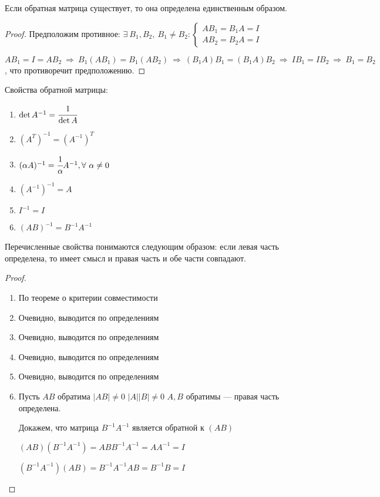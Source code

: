 \begin{theor}Если обратная матрица существует, то она определена единственным образом.\end{theor}
\begin{proof}
Предположим противное: $\exists\ B_1,B_2,\ B_1\neq{}B_2:\left\{\begin{aligned} AB_1=B_1A=I \\ AB_2=B_2A=I \end{aligned}\right.$

$AB_1=I=AB_2\ \Rightarrow\ B_1(AB_1)=B_1(AB_2)\ \Rightarrow\ (B_1A)B_1=(B_1A)B_2\ \Rightarrow\ IB_1=IB_2\ \Rightarrow\ B_1=B_2$, что противоречит предположению.
\end{proof}
\begin{theor}
Свойства обратной матрицы:\begin{enumerate}
\item $\det A^{-1}=\cfrac1{\det A}$
\item $(A^T)^{-1}=(A^{-1})^T$
\item $(\alpha{}A)^{-1}=\cfrac1\alpha{}A^{-1}, \forall\ \alpha\neq0$
\item $(A^{-1})^{-1}=A$
\item $I^{-1}=I$
\item $(AB)^{-1}=B^{-1}A^{-1}$
\end{enumerate}
\end{theor}
\begin{remark}
Перечисленные свойства понимаются следующим образом: если левая часть определена, то имеет смысл и правая часть и обе части совпадают.
\end{remark}
\begin{proof}
\begin{enumerate}
\item По теореме о критерии совместимости
\item Очевидно, выводится по определениям
\item Очевидно, выводится по определениям
\item Очевидно, выводится по определениям
\item Очевидно, выводится по определениям
\item Пусть $AB$ обратима \then $|AB|\neq0$ \then $|A||B|\neq0$ \then $A,B$ обратимы --- правая часть определена.

Докажем, что матрица $B^{-1}A^{-1}$ является обратной к $(AB)$

$(AB)(B^{-1}A^{-1})=ABB^{-1}A^{-1}=AA^{-1}=I$

$(B^{-1}A^{-1})(AB)=B^{-1}A^{-1}AB=B^{-1}B=I$

\end{enumerate}
\end{proof}

